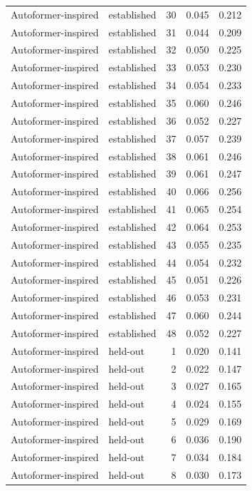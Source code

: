 \begin{tabular}{llrrr}
Autoformer-inspired & established & 30 & 0.045 & 0.212 \\
Autoformer-inspired & established & 31 & 0.044 & 0.209 \\
Autoformer-inspired & established & 32 & 0.050 & 0.225 \\
Autoformer-inspired & established & 33 & 0.053 & 0.230 \\
Autoformer-inspired & established & 34 & 0.054 & 0.233 \\
Autoformer-inspired & established & 35 & 0.060 & 0.246 \\
Autoformer-inspired & established & 36 & 0.052 & 0.227 \\
Autoformer-inspired & established & 37 & 0.057 & 0.239 \\
Autoformer-inspired & established & 38 & 0.061 & 0.246 \\
Autoformer-inspired & established & 39 & 0.061 & 0.247 \\
Autoformer-inspired & established & 40 & 0.066 & 0.256 \\
Autoformer-inspired & established & 41 & 0.065 & 0.254 \\
Autoformer-inspired & established & 42 & 0.064 & 0.253 \\
Autoformer-inspired & established & 43 & 0.055 & 0.235 \\
Autoformer-inspired & established & 44 & 0.054 & 0.232 \\
Autoformer-inspired & established & 45 & 0.051 & 0.226 \\
Autoformer-inspired & established & 46 & 0.053 & 0.231 \\
Autoformer-inspired & established & 47 & 0.060 & 0.244 \\
Autoformer-inspired & established & 48 & 0.052 & 0.227 \\
Autoformer-inspired & held-out & 1 & 0.020 & 0.141 \\
Autoformer-inspired & held-out & 2 & 0.022 & 0.147 \\
Autoformer-inspired & held-out & 3 & 0.027 & 0.165 \\
Autoformer-inspired & held-out & 4 & 0.024 & 0.155 \\
Autoformer-inspired & held-out & 5 & 0.029 & 0.169 \\
Autoformer-inspired & held-out & 6 & 0.036 & 0.190 \\
Autoformer-inspired & held-out & 7 & 0.034 & 0.184 \\
Autoformer-inspired & held-out & 8 & 0.030 & 0.173 \\

\end{tabular}
